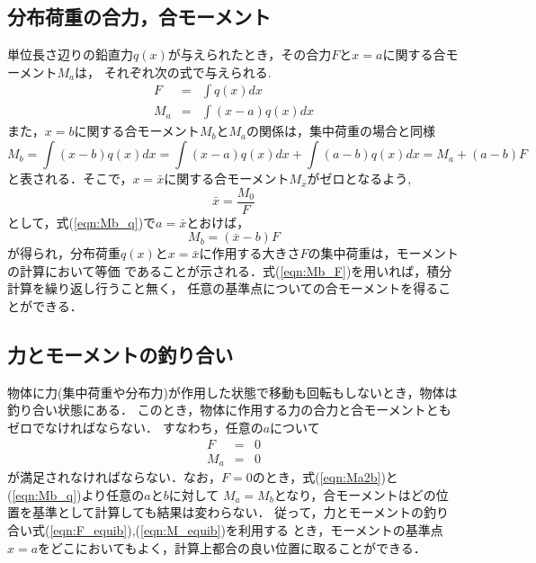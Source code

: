 \documentclass[10pt,a4j]{jarticle}
\begin{document}
\subsection{分布荷重の合力，合モーメント}
単位長さ辺りの鉛直力$q(x)$が与えられたとき，その合力$F$と$x=a$に関する合モーメント$M_a$は，
それぞれ次の式で与えられる.
\begin{eqnarray}
	F &= & \int q(x) dx 
	\label{eqn:Ftot_q}
	\\
	M_a &= & \int (x-a)q(x) dx 
	\label{eqn:Mtot_q}
\end{eqnarray}
また，$x=b$に関する合モーメント$M_b$と$M_a$の関係は，集中荷重の場合と同様
\begin{equation}
	M_b = \int (x-b)q(x)dx = \int (x-a)q(x) dx + \int (a-b)q(x)dx = M_a+(a-b) F
	\label{eqn:Mb_q}
\end{equation}
と表される．そこで，$x=\bar x$に関する合モーメント$M_{\bar x}$がゼロとなるよう,
\begin{equation}
	\bar x = \frac{M_0}{F}
\end{equation}
として，式(\ref{eqn:Mb_q})で$a=\bar x$とおけば，
\begin{equation}
	M_b=\left(\bar x - b\right)F
	\label{eqn:Mb_F}
\end{equation}
が得られ，分布荷重$q(x)$と$x=\bar x$に作用する大きさ$F$の集中荷重は，モーメントの計算において等価
であることが示される．式(\ref{eqn:Mb_F})を用いれば，積分計算を繰り返し行うこと無く，
任意の基準点についての合モーメントを得ることができる．
\subsection{力とモーメントの釣り合い}
物体に力(集中荷重や分布力)が作用した状態で移動も回転もしないとき，物体は釣り合い状態にある．
このとき，物体に作用する力の合力と合モーメントともゼロでなければならない．
すなわち，任意の$a$について
\begin{eqnarray}
	F &= &  0 
	\label{eqn:F_equib}
	\\
	M_a &= &  
	0 
	\label{eqn:M_equib}
\end{eqnarray}
が満足されなければならない．なお，$F=0$のとき，式(\ref{eqn:Ma2b})と(\ref{eqn:Mb_q})より任意の$a$と$b$に対して
$M_a=M_b$となり，合モーメントはどの位置を基準として計算しても結果は変わらない．
従って，力とモーメントの釣り合い式(\ref{eqn:F_equib}),(\ref{eqn:M_equib})を利用する
とき，モーメントの基準点$x=a$をどこにおいてもよく，計算上都合の良い位置に取ることができる．
\end{document}
